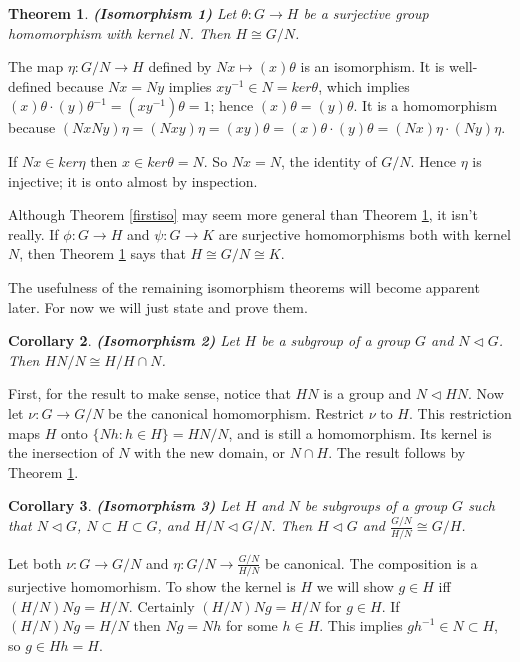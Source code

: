 \documentclass[letter]{article}
\newtheorem{theorem}{Theorem}[section]
\newtheorem{corollary}[theorem]{Corollary}
\newcommand{\mdot}{{\cdot}}
\newenvironment{proof}[1][Proof]{\begin{trivlist}
\item[\hskip \labelsep {\bfseries #1}]}{\end{trivlist}}
\begin{document}
\begin{theorem}
\label{iso1}
\emph{\textbf{(Isomorphism 1)}}
Let $\theta \colon G \rightarrow H$ be a surjective group homomorphism with kernel $N$.  Then $H \cong G/N$.
\end{theorem}
\begin{proof}
The map $\eta \colon G/N \rightarrow H$ defined by $Nx \mapsto (x)\theta$ is an isomorphism. It is well-defined because $Nx = Ny$ implies $xy^{-1} \in N = ker \theta$, which implies $(x)\theta\mdot(y)\theta^{-1} = (xy^{-1})\theta = 1$; hence $(x)\theta = (y)\theta$. It is a homomorphism because $(NxNy)\eta = (Nxy)\eta = (xy)\theta = (x)\theta\mdot(y)\theta = (Nx)\eta\mdot(Ny)\eta$.

If $Nx \in ker \eta$ then $x \in ker \theta = N$. So $Nx = N$, the identity of $G/N$. Hence $\eta$ is injective; it is onto almost by inspection.
\end{proof}

Although Theorem \ref{firstiso} may seem more general than Theorem \ref{iso1}, it isn't really. If $\phi \colon G \rightarrow H$ and $\psi \colon G \rightarrow K$ are surjective homomorphisms both with kernel $N$, then Theorem \ref{iso1} says that $H \cong G/N \cong K$.

The usefulness of the remaining isomorphism theorems will become apparent later. For now we will just state and prove them.

\begin{corollary}
\label{iso2}
\emph{\textbf{(Isomorphism 2)}}
Let $H$ be a subgroup of a group $G$ and $N \lhd G$.  Then $HN/N \cong H/{H \cap N}$.
\end{corollary}
\begin{proof}
First, for the result to make sense, notice that $HN$ is a group and $N \lhd HN$.  Now let $\nu \colon G \rightarrow G/N$ be the canonical homomorphism. Restrict $\nu$ to $H$. This restriction maps $H$ onto $\{Nh \colon h \in H\} = HN/N$, and is still a homomorphism. Its kernel is the inersection of $N$ with the new domain, or $N \cap H$. The result follows by Theorem \ref{iso1}.
\end{proof}

\begin{corollary}
\label{iso3}
\emph{\textbf{(Isomorphism 3)}}
Let $H$ and $N$ be subgroups of a group $G$ such that $N \lhd G$, $N \subset H \subset G$, and $H/N \lhd G/N$. Then $H \lhd G$ and $\frac{G/N}{H/N} \cong G/H$.
\end{corollary}
\begin{proof}
Let both $\nu \colon G \rightarrow G/N$ and $\eta \colon G/N \rightarrow \frac{G/N}{H/N}$ be canonical. The composition is a surjective homomorhism. To show the kernel is $H$ we will show $g \in H$ iff $(H/N)Ng = H/N$. Certainly $(H/N)Ng = H/N$ for $g \in H$. If $(H/N)Ng = H/N$ then $Ng = Nh$ for some $h \in H$. This implies $gh^{-1} \in N \subset H$, so $g \in Hh = H$.
\end{proof}
\end{document}
